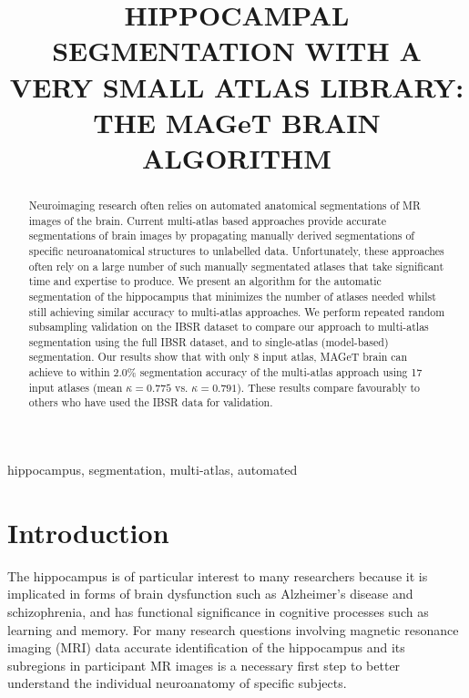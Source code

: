 \documentclass{article}\usepackage{graphicx, color}
\title{HIPPOCAMPAL SEGMENTATION WITH A VERY SMALL ATLAS LIBRARY: THE MAGeT
BRAIN ALGORITHM}
\begin{document}
\maketitle       

\begin{abstract}
Neuroimaging research often relies on automated anatomical segmentations of MR
images of the brain. Current multi-atlas based approaches provide accurate
segmentations of brain images by propagating manually derived segmentations of
specific neuroanatomical structures to unlabelled data. Unfortunately, these
approaches often rely on a large number of such manually segmentated atlases
that take significant time and expertise to produce. We present an algorithm
for the automatic segmentation of the hippocampus that minimizes the number of
atlases needed whilst still achieving similar accuracy to multi-atlas
approaches.  We perform repeated random subsampling validation on the IBSR
dataset to compare our approach to multi-atlas segmentation using the full IBSR
dataset, and to single-atlas (model-based) segmentation. Our results show that
with only 8 input atlas, MAGeT brain can achieve to within 2.0\% segmentation
accuracy of the multi-atlas approach using 17 input atlases (mean $\kappa =
0.775$ vs.  $\kappa = 0.791$).  These results compare favourably to others who
have used the IBSR data for validation. 
\end{abstract}

\begin{keywords}
hippocampus, segmentation, multi-atlas, automated
\end{keywords}

\section{Introduction}
\label{sec:intro}

The hippocampus is of particular interest to many researchers because it is
implicated in forms of brain dysfunction such as Alzheimer's disease and
schizophrenia, and has functional significance in cognitive processes such as
learning and memory.  For many research questions involving magnetic resonance
imaging (MRI) data accurate identification of the hippocampus and its
subregions in participant MR images is a necessary first step to better
understand the individual neuroanatomy of specific subjects.  
\end{document}
